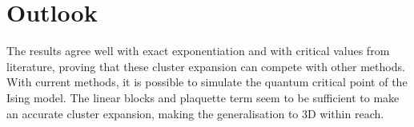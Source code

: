 \documentclass[twocolumn]{article}
\newcounter{a}
\newcounter{b}
\begin{document}
\section{Outlook}

The results agree well with exact exponentiation and with critical values from literature, proving that these cluster expansion can compete with other methods. With current methods, it is possible to simulate the quantum critical point of the Ising model. The linear blocks and plaquette term seem to be sufficient to make an accurate cluster expansion, making the generalisation to 3D within reach.



\end{document}
